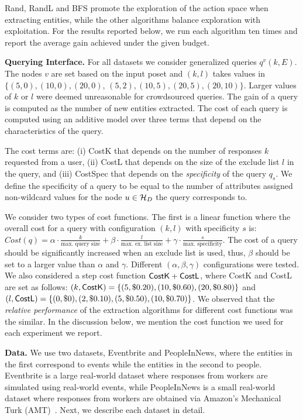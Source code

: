 Rand, RandL and BFS promote the exploration of the action space when extracting entities, while the other algorithms balance exploration with exploitation. For the results reported below, we run each algorithm ten times and report the average gain achieved under the given budget.

\noindent\textbf{Querying Interface.} For all datasets we consider generalized queries $q^v(k,E)$. The nodes $v$ are set based on the input poset and $(k,l)$ takes values in {\small $\{(5,0), (10,0), (20,0)$, $(5,2), (10,5), (20,5), (20,10)\}$}. Larger values of $k$ or $l$ were deemed unreasonable for crowdsourced queries. The gain of a query is computed as the number of new entities extracted. The cost of each query is computed using an additive model over three terms that depend on the characteristics of the query. 

The cost terms are: (i) {\sf CostK} that depends on the number of responses $k$ requested from a user, (ii) {\sf CostL} that depends on the size of the exclude list $l$ in the query, and (iii) {\sf CostSpec} that depends on the {\em specificity} of the query $q_s$. We define the specificity of a query to be equal to the number of attributes assigned non-wildcard values for the node $u \in \mathcal{H}_D$ the query corresponds to. 

We consider two types of cost functions. The first is a linear function where the overall cost for a query with configuration $(k,l)$ with specificity $s$ is:{\scriptsize $Cost(q) = \alpha \cdot \frac{k}{\mbox{max. query size}} + \beta \cdot  \frac{l}{\mbox{max. ex. list size}} + \gamma \cdot  \frac{s}{\mbox{max. specificity}} $}. The cost of a query should be significantly increased when an exclude list is used, thus, $\beta$ should be set to a larger value than $\alpha$ and $\gamma$. Different $(\alpha, \beta, \gamma)$ configurations were tested. We also considered a step cost function ${\sf CostK} + {\sf CostL}$, where {\sf CostK} and {\sf CostL} are set as follows: $(k,{\sf CostK}) = \{(5,\$0.20), (10,\$0.60), (20,\$0.80)\}$ and $(l,{\sf CostL}) = \{(0,\$0), (2,\$0.10), (5,\$0.50), (10,\$0.70)\}$. We observed that the {\em relative performance} of the extraction algorithms for different cost functions was the similar. In the discussion below, we mention the cost function we used for each experiment we report. 

\noindent\textbf{Data.} We use two datasets, Eventbrite and PeopleInNews, where the entities in the first correspond to events while the entities in the second to people. Eventbrite is a large real-world dataset where responses from workers are simulated using real-world events, while PeopleInNews is a small real-world dataset where responses from workers are obtained via Amazon's Mechanical Turk (AMT)~\cite{mturk}. Next, we describe each dataset in detail.

